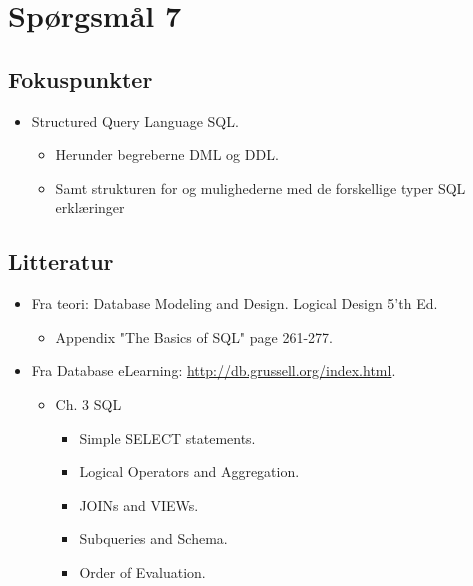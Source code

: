 \section{Spørgsmål 7}


\subsection{Fokuspunkter}
\begin{itemize}
	\item Structured Query Language SQL.
	\begin{itemize}
		\item Herunder begreberne DML og DDL.
		\item Samt strukturen for og mulighederne med de forskellige typer SQL erklæringer
	\end{itemize}
\end{itemize}

\subsection{Litteratur}
\begin{itemize}
	
	\item Fra teori: Database Modeling and Design. Logical Design 5'th Ed.
	\begin{itemize}
		\item Appendix "The Basics of SQL" page 261-277.
	\end{itemize}
	
	\item Fra Database eLearning: \url{http://db.grussell.org/index.html}.
	\begin{itemize}
		\item Ch. 3 SQL
		\begin{itemize}
			\item Simple SELECT statements.
			\item Logical Operators and Aggregation.
			\item JOINs and VIEWs.
			\item Subqueries and Schema.
			\item Order of Evaluation.
		\end{itemize}
	\end{itemize}
	
%	
\end{itemize}


